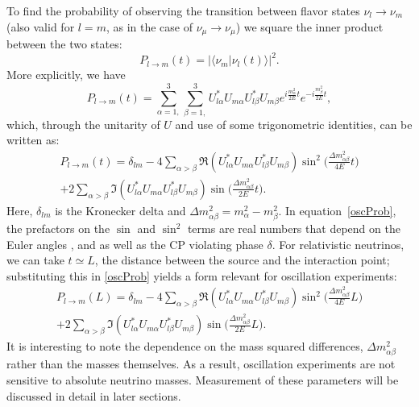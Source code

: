 To find the probability of observing the transition between flavor states
$\nu_l \rightarrow \nu_m$ (also valid for $l=m$, as in the case of
$\nu_\mu \rightarrow \nu_\mu$) we square the inner product between the two
states:
\begin{equation}\label{probSimp}
P_{l\rightarrow m}(t) = |\langle \nu_m | \nu_l(t)\rangle |^2.
\end{equation}
More explicitly, we have
\begin{equation}\label{probComp}
P_{l\rightarrow m}(t) = \sum_{\alpha = 1,}^3 \sum_{\beta = 1,}^3 U^*_{l\alpha}U_{m\alpha}U^*_{l\beta}U_{m\beta} e^{i\frac{m_\alpha^2}{2E}t} e^{-i\frac{m_\beta^2}{2E}t},
\end{equation}
which, through the unitarity of $U$ and use of some trigonometric identities,
can be written as:
\begin{equation}\begin{split}\label{oscProb}
P_{l\rightarrow m}(t) =  \delta_{lm} - 4  \sum_{\alpha > \beta}  \Re(U^*_{l\alpha}U_{m\alpha}U^*_{l\beta}U_{m\beta}) \sin^2 \bigg(\frac{\Delta m_{\alpha\beta}^2}{4E} t\bigg) \\
 + 2  \sum_{\alpha>\beta}  \Im(U^*_{l\alpha}U_{m\alpha}U^*_{l\beta}U_{m\beta}) \sin\bigg(\frac{\Delta m_{\alpha\beta}^2}{2E}t\bigg).
\end{split}\end{equation}
Here, $\delta_{lm}$ is the Kronecker delta and
$\Delta m^2_{\alpha\beta} = m_\alpha^2 - m_\beta^2$.
In equation~\eqref{oscProb}, the prefactors on the $\sin$ and $\sin^2$ terms
are real numbers that depend on the Euler angles \thetaot, \thetatth and
\thetaoth as well as the CP violating phase $\delta$.
For relativistic neutrinos, we can take $t \simeq L$, the distance between the
source and the interaction point; substituting this in \eqref{oscProb} yields a
form relevant for oscillation experiments:
\begin{equation}\begin{split}\label{oscProbL}
P_{l\rightarrow m}(L) =  \delta_{lm} - 4  \sum_{\alpha > \beta}  \Re(U^*_{l\alpha}U_{m\alpha}U^*_{l\beta}U_{m\beta}) \sin^2 \bigg(\frac{\Delta m_{\alpha\beta}^2}{4E} L\bigg) \\
 + 2  \sum_{\alpha>\beta}  \Im(U^*_{l\alpha}U_{m\alpha}U^*_{l\beta}U_{m\beta}) \sin\bigg(\frac{\Delta m_{\alpha\beta}^2}{2E}L\bigg).
\end{split}\end{equation}
It is interesting to note the dependence on the mass squared differences,
$\Delta m^2_{\alpha\beta}$ rather than the masses themselves.
As a result, oscillation experiments are not sensitive to absolute neutrino
masses.
Measurement of these parameters will be discussed in detail in later sections.

